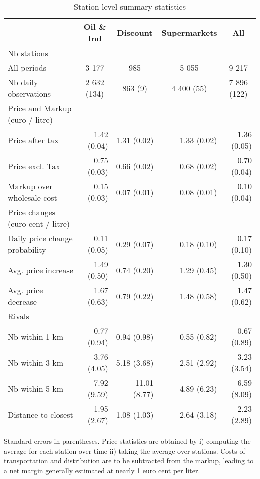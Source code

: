 \documentclass[english]{article}
\begin{document}
\begin{table}
\begin{threeparttable}
\renewcommand{\arraystretch}{0.8} %
\caption{Station-level summary statistics}
\label{tab:station_stats_des}
    \begin{tabular}{lrrrr}
    \toprule
    \toprule
          & \multicolumn{1}{c}{Oil \& Ind} & \multicolumn{1}{c}{Discount} & \multicolumn{1}{c}{Supermarkets} & \multicolumn{1}{c}{All} \\
    \midrule
    Nb stations &       &       &       &  \\
    All periods & \multicolumn{1}{c}{3 177} & \multicolumn{1}{c}{985} & \multicolumn{1}{c}{5 055} & \multicolumn{1}{c}{9 217} \\
    Nb daily observations & \multicolumn{1}{c}{2 632 (134)} & \multicolumn{1}{c}{863 (9)} & \multicolumn{1}{c}{4 400 (55)} & \multicolumn{1}{c}{7 896 (122)} \\
    \midrule
    Price and Markup (euro / litre) &       &       &       &  \\
    Price after tax & 1.42 (0.04) & 1.31 (0.02) & 1.33 (0.02) & 1.36 (0.05) \\
    Price excl. Tax & 0.75 (0.03) & 0.66 (0.02) & 0.68 (0.02) & 0.70 (0.04) \\
    Markup over wholesale cost & 0.15 (0.03) & 0.07 (0.01) & 0.08 (0.01) & 0.10 (0.04) \\
    \midrule
    Price changes (euro cent / litre) &       &       &       &  \\
    Daily price change probability & 0.11 (0.05) & 0.29 (0.07) & 0.18 (0.10) & 0.17 (0.10) \\
    Avg. price increase & 1.49 (0.50) & 0.74 (0.20) & 1.29 (0.45) & 1.30 (0.50) \\
    Avg. price decrease & 1.67 (0.63) & 0.79 (0.22) & 1.48 (0.58) & 1.47 (0.62) \\
    \midrule
    Rivals &       &       &       &  \\
    Nb within 1 km & 0.77 (0.94) & 0.94 (0.98) & 0.55 (0.82) & 0.67 (0.89) \\
    Nb within 3 km & 3.76 (4.05) & 5.18 (3.68) & 2.51 (2.92) & 3.23 (3.54) \\
    Nb within 5 km & 7.92 (9.59) & 11.01 (8.77) & 4.89 (6.23) & 6.59 (8.09) \\
    Distance to closest & 1.95 (2.67) & 1.08 (1.03) & 2.64 (3.18) & 2.23 (2.89) \\
   \bottomrule
   \bottomrule
\end{tabular}
\begin{tablenotes}
			\small
			\item Standard errors in parentheses. Price statistics are obtained by i) computing the average for each station over time ii) taking the average over stations. Costs of transportation and distribution are to be subtracted from the markup, leading to a net margin generally estimated at nearly 1 euro cent per liter.
\end{tablenotes}
\end{threeparttable}
\end{table}
\end{document}

